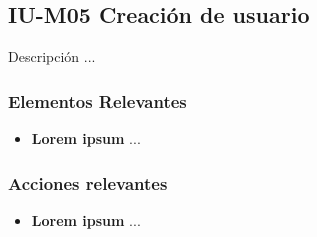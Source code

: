 
\subsection{IU-M05 Creación de usuario}

 Descripción ...


\subsubsection{Elementos Relevantes}

    \begin{itemize}
    \item {\bf Lorem ipsum}
        ...
    \end{itemize}

\subsubsection{Acciones relevantes}

    \begin{itemize}
    \item {\bf Lorem ipsum}
        ...
    \end{itemize}

\clearpage
